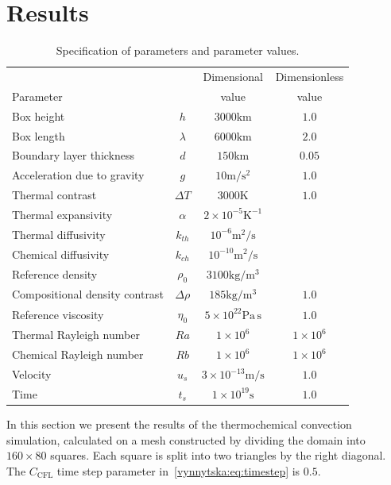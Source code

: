 
\section{Results}
\label{vynnytska:sec:results}

\begin{table}
  \begin{tabular}{l c c c}
    & & Dimensional & Dimensionless \\
    Parameter & & value & value \\
    \toprule
    Box height & $h$ & $3000\mathrm{km}$ & $1.0$\\
    Box length & $\lambda$ & $6000\mathrm{km}$ & $2.0$ \\
    Boundary layer thickness & $d$ & $150\mathrm{km}$ & $0.05$ \\
    Acceleration due to gravity & $g$ & $10\mathrm{m/s^2}$ & $1.0$ \\
    Thermal contrast & $\Delta T$ & $3000\mathrm{K}$ & $1.0$ \\
    Thermal expansivity & $\alpha$ & $2 \times 10^{-5}\mathrm{K^{-1}}$ & \\
    Thermal diffusivity & $k_{th}$ & $10^{-6}\mathrm{m^{2}/s}$ & \\
    Chemical diffusivity & $k_{ch}$ & $10^{-10}\mathrm{m^{2}/s}$ & \\
    Reference density & $\rho_{0}$ & $3100\mathrm{kg/m^{3}}$ &  \\
    Compositional density contrast & $\Delta \rho $ & $185\mathrm{kg/m^{3}}$ & $1.0$ \\
    Reference viscosity & $\eta_{0}$ & $5 \times 10^{22} \mathrm{Pa \, s}$ & $1.0$ \\
    Thermal Rayleigh number & $Ra$ & $1 \times 10^{6}$ & $ 1 \times 10^{6}$\\
    Chemical Rayleigh number & $Rb$ & $1 \times 10^{6}$ & $1 \times 10^{6}$\\
    Velocity & $u_s$ & $3 \times 10^{-13} \mathrm{m/s}$& $1.0$ \\
    Time & $t_s$ & $1 \times 10^{19} \mathrm{s}$& $1.0$ \\
    \bottomrule
  \end{tabular}
  \label{vynnytska:table:variables}
  \caption{Specification of parameters and parameter values.}
\end{table}
In this section we present the results of the thermochemical
convection simulation, calculated on a mesh constructed by dividing
the domain into $160 \times 80$ squares. Each square is split into two
triangles by the right diagonal. The $C_{\mathrm{CFL}}$ time step
parameter in~\eqref{vynnytska:eq:timestep} is $0.5$.

